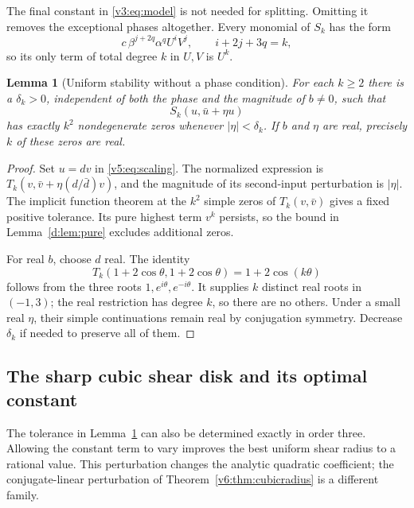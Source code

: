 \documentclass[UTF8,11pt]{ctexart}
\newtheorem{lem}[thm]{Lemma}
\theoremstyle{definition}
\numberwithin{equation}{section}
\begin{document}
The final constant in \eqref{v3:eq:model} is not needed for
splitting. Omitting it removes the exceptional phases altogether.
Every monomial of $S_k$ has the form
\begin{equation}\label{v3:eq:monomial}
 c\,\beta^{j+2q}\alpha^qU^iV^j,\qquad i+2j+3q=k,
\end{equation}
so its only term of total degree $k$ in $U,V$ is $U^k$.

\begin{lem}[Uniform stability without a phase condition]
\label{v3:lem:stability}
For each $k\ge2$ there is a $\delta_k>0$, independent of
both the phase and the magnitude of $b\ne0$, such that
\begin{equation}\label{v4:eq:shearedmodel}
 S_k(u,\bar u+\eta u)
\end{equation}
has exactly $k^2$ nondegenerate zeros whenever $|\eta|<\delta_k$.
If $b$ and $\eta$ are real, precisely $k$ of these zeros are real.
\end{lem}
\begin{proof}
Set $u=dv$ in \eqref{v5:eq:scaling}. The normalized expression is
$T_k(v,\bar v+\eta(d/\bar d)v)$, and the magnitude of its
second-input perturbation is $|\eta|$. The implicit function theorem
at the $k^2$ simple zeros of $T_k(v,\bar v)$ gives a fixed positive
tolerance. Its pure highest term $v^k$ persists, so the bound in
Lemma~\ref{d:lem:pure} excludes additional zeros.

For real $b$, choose $d$ real. The identity
\begin{equation}\label{v5:eq:realrestriction}
 T_k(1+2\cos\theta,1+2\cos\theta)=1+2\cos(k\theta)
\end{equation}
follows from the three roots $1,e^{i\theta},e^{-i\theta}$.
It supplies $k$ distinct real roots in $(-1,3)$; the real
restriction has degree $k$, so there are no others. Under a small
real $\eta$, their simple continuations remain real by conjugation
symmetry. Decrease $\delta_k$ if needed to preserve all of them.
\end{proof}


\subsection{The sharp cubic shear disk and its optimal constant}
\label{v18:sec:cubicshear}

The tolerance in Lemma~\ref{v3:lem:stability} can also be determined
exactly in order three. Allowing the constant term to vary improves
the best uniform shear radius to a rational value. This perturbation
changes the analytic quadratic coefficient; the conjugate-linear
perturbation of Theorem~\ref{v6:thm:cubicradius} is a different family.
\end{document}
